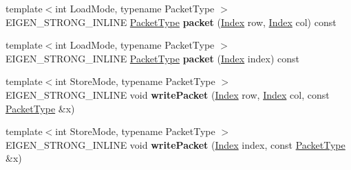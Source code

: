 \begin{DoxyCompactItemize}
\item 
\mbox{\label{struct_eigen_1_1internal_1_1evaluator__wrapper__base_aa507d02b7eed05b93a9ebfcde14028a7}} 
{\footnotesize template$<$int Load\+Mode, typename Packet\+Type $>$ }\\E\+I\+G\+E\+N\+\_\+\+S\+T\+R\+O\+N\+G\+\_\+\+I\+N\+L\+I\+NE \hyperlink{struct_eigen_1_1_packet_type}{Packet\+Type} {\bfseries packet} (\hyperlink{namespace_eigen_a62e77e0933482dafde8fe197d9a2cfde}{Index} row, \hyperlink{namespace_eigen_a62e77e0933482dafde8fe197d9a2cfde}{Index} col) const
\item 
\mbox{\label{struct_eigen_1_1internal_1_1evaluator__wrapper__base_a1d5c0ece1d9beb02a6e3cf3cbff39220}} 
{\footnotesize template$<$int Load\+Mode, typename Packet\+Type $>$ }\\E\+I\+G\+E\+N\+\_\+\+S\+T\+R\+O\+N\+G\+\_\+\+I\+N\+L\+I\+NE \hyperlink{struct_eigen_1_1_packet_type}{Packet\+Type} {\bfseries packet} (\hyperlink{namespace_eigen_a62e77e0933482dafde8fe197d9a2cfde}{Index} index) const
\item 
\mbox{\label{struct_eigen_1_1internal_1_1evaluator__wrapper__base_a05c007daf5b8cc64e2c962c6ddb1b9be}} 
{\footnotesize template$<$int Store\+Mode, typename Packet\+Type $>$ }\\E\+I\+G\+E\+N\+\_\+\+S\+T\+R\+O\+N\+G\+\_\+\+I\+N\+L\+I\+NE void {\bfseries write\+Packet} (\hyperlink{namespace_eigen_a62e77e0933482dafde8fe197d9a2cfde}{Index} row, \hyperlink{namespace_eigen_a62e77e0933482dafde8fe197d9a2cfde}{Index} col, const \hyperlink{struct_eigen_1_1_packet_type}{Packet\+Type} \&x)
\item 
\mbox{\label{struct_eigen_1_1internal_1_1evaluator__wrapper__base_a1adee3ca0efc3280603884dda77bd012}} 
{\footnotesize template$<$int Store\+Mode, typename Packet\+Type $>$ }\\E\+I\+G\+E\+N\+\_\+\+S\+T\+R\+O\+N\+G\+\_\+\+I\+N\+L\+I\+NE void {\bfseries write\+Packet} (\hyperlink{namespace_eigen_a62e77e0933482dafde8fe197d9a2cfde}{Index} index, const \hyperlink{struct_eigen_1_1_packet_type}{Packet\+Type} \&x)
\item 
\mbox{\label{struct_eigen_1_1internal_1_1evaluator__wrapper__base_a529c1380dce98ac43ff335c41fe3b314}} 

\end{DoxyCompactItemize}
